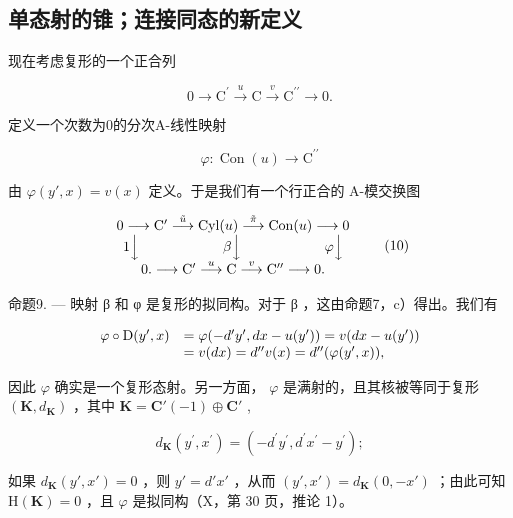 \subsection{单态射的锥；连接同态的新定义}

现在考虑复形的一个正合列

\[
0 \rightarrow \mathrm{C} ^ {\prime} \xrightarrow {u} \mathrm{C} \xrightarrow {v} \mathrm{C} ^ {\prime \prime} \rightarrow 0.\tag{9}
\]

定义一个次数为0的分次A-线性映射

\[
\varphi : \operatorname{Con} (u) \rightarrow \mathrm{C} ^ {\prime \prime}
\]

由 \(\varphi(y', x) = v(x)\) 定义。于是我们有一个行正合的 A-模交换图

\[
\begin{array}{c} 0 \longrightarrow \mathrm{C} ^ {\prime} \stackrel {{\tilde {u}}} {{\longrightarrow}} \mathrm{Cyl} (u) \stackrel {{\tilde {\pi}}} {{\longrightarrow}} \mathrm{Con} (u) \longrightarrow 0 \\ 1 \Big \downarrow \qquad \qquad \qquad \beta \Big \downarrow \qquad \qquad \qquad \varphi \Big \downarrow \\ 0. \longrightarrow \mathrm{C} ^ {\prime} \stackrel {{u}} {{\longrightarrow}} \mathrm{C} \stackrel {{v}} {{\longrightarrow}} \mathrm{C} ^ {\prime \prime} \longrightarrow 0. \end{array}\tag{10}
\]

命题9. --- 映射 β 和 φ 是复形的拟同构。对于 β ，这由命题7，c）得出。我们有

\[
\begin{array}{r l} \varphi \circ \mathrm{D} (y ^ {\prime}, x) & = \varphi (- d ^ {\prime} y ^ {\prime}, d x - u (y ^ {\prime})) = v (d x - u (y ^ {\prime})) \\ & = v (d x) = d ^ {\prime \prime} v (x) = d ^ {\prime \prime} (\varphi (y ^ {\prime}, x)), \end{array}
\]

因此 \(\varphi\) 确实是一个复形态射。另一方面， \(\varphi\) 是满射的，且其核被等同于复形 \((\mathbf{K}, d_{\mathbf{K}})\) ，其中 \(\mathbf{K} = \mathbf{C}'(-1) \oplus \mathbf{C}'\) ,

\[
d _ {\mathbf {K}} (y ^ {\prime}, x ^ {\prime}) = (- d ^ {\prime} y ^ {\prime}, d ^ {\prime} x ^ {\prime} - y ^ {\prime});
\]

如果 \(d_{\mathbf{K}}(y', x') = 0\) ，则 \(y' = d'x'\) ，从而 \((y', x') = d_{\mathbf{K}}(0, -x')\) ；由此可知 \(\mathrm{H}(\mathbf{K}) = 0\) ，且 \(\varphi\) 是拟同构（X，第 30 页，推论 1）。

